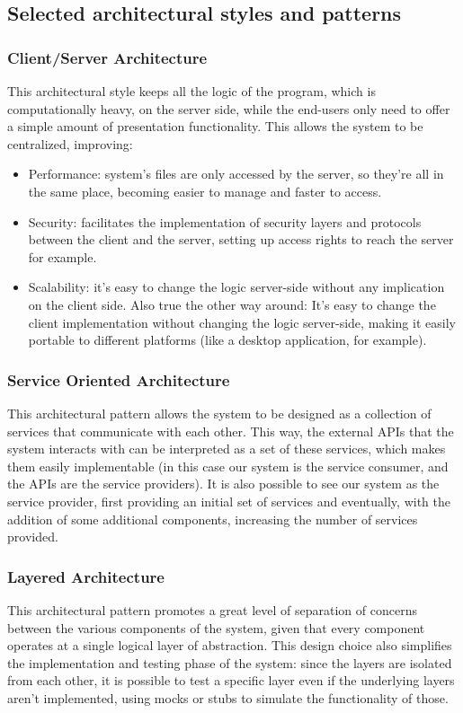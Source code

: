 \documentclass[12pt]{article}
\begin{document}
\subsection{Selected architectural styles and patterns}

\subsubsection{Client/Server Architecture} This architectural style keeps all the logic of the program, which is computationally heavy, on the server side, while the end-users only need to offer a simple amount of presentation functionality. This allows the system to be centralized, improving:
\begin{itemize}
    \item Performance: system's files are only accessed by the server, so they're all in the same place, becoming easier to manage and faster to access.
    \item Security: facilitates the implementation of security layers and protocols between the client and the server, setting up access rights to reach the server for example.
    \item Scalability: it's easy to change the logic server-side without any implication on the client side. Also true the other way around: It's easy to change the client implementation without changing the logic server-side, making it easily portable to different platforms (like a desktop application, for example).
\end{itemize}

\subsubsection{Service Oriented Architecture} This architectural pattern allows the system to be designed as a collection of services that communicate with each other. This way, the external APIs that the system interacts with can be interpreted as a set of these services, which makes them easily implementable (in this case our system is the service consumer, and the APIs are the service providers). It is also possible to see our system as the service provider, first providing an initial set of services and eventually, with the addition of some additional components, increasing the number of services provided.

\subsubsection{Layered Architecture} This architectural pattern promotes a great level of separation of concerns between the various components of the system, given that every component operates at a single logical layer of abstraction. This design choice also simplifies the implementation and testing phase of the system: since the layers are isolated from each other, it is possible to test a specific layer even if the underlying layers aren't implemented, using mocks or stubs to simulate the functionality of those.
\end{document}
